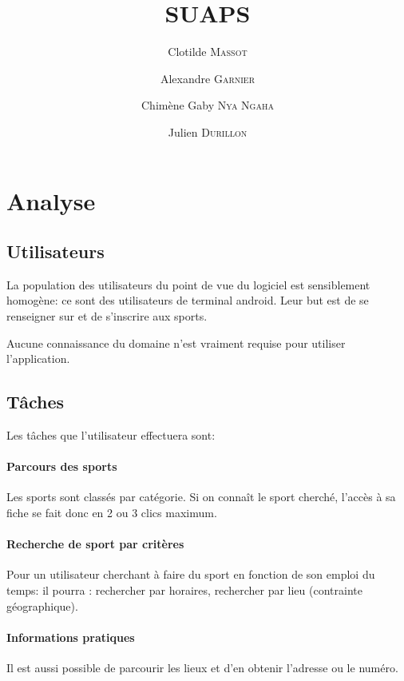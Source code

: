 \documentclass{article}
\title{SUAPS}
\author{Clotilde \textsc{Massot} \and Alexandre \textsc{Garnier} \and Chimène Gaby \textsc{Nya Ngaha} \and Julien \textsc{Durillon}}
\begin{document}
\maketitle

\section{Analyse}
\label{sec:analyse}

	\subsection{Utilisateurs}
		La population des utilisateurs du point de vue du logiciel est
		sensiblement homogène: ce sont des utilisateurs de terminal android.
		Leur but est de se renseigner sur et de s'inscrire aux sports.

		Aucune connaissance du domaine n'est vraiment requise pour utiliser
		l'application.

	\subsection{Tâches}

	 Les tâches que l'utilisateur effectuera sont:

	    \paragraph{Parcours des sports}

	        Les sports sont classés par catégorie. Si on connaît le sport
	        cherché, l'accès à sa fiche se fait donc en 2 ou 3 \og clics\fg{}
	        maximum.

        \paragraph{Recherche de sport par critères}

            Pour un utilisateur cherchant à faire du sport en fonction de son
            emploi du temps: il pourra : rechercher par horaires, rechercher par
            lieu (contrainte géographique).

        \paragraph{Informations pratiques}

            Il est aussi possible de parcourir les lieux et d'en obtenir
            l'adresse ou le numéro.
\end{document}
